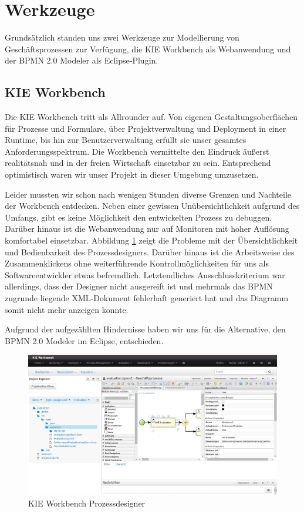 \section{Werkzeuge}
Grundsätzlich standen uns zwei Werkzeuge zur Modellierung von Geschäftsprozessen zur Verfügung, die KIE Workbench als Webanwendung und der BPMN 2.0 Modeler als Eclipse-Plugin.
\subsection{KIE Workbench}
Die KIE Workbench tritt als Allrounder auf. Von eigenen Gestaltungsoberflächen für Prozesse und Formulare, über Projektverwaltung und Deployment in einer Runtime, bis hin zur Benutzerverwaltung erfüllt sie unser gesamtes Anforderungsspektrum. Die Workbench vermittelte den Eindruck äußerst realitätsnah und in der freien Wirtschaft einsetzbar zu sein. Entsprechend optimistisch waren wir unser Projekt in dieser Umgebung umzusetzen.

Leider mussten wir schon nach wenigen Stunden diverse Grenzen und Nachteile der Workbench entdecken. Neben einer gewissen Unübersichtlichkeit aufgrund des Umfangs, gibt es keine Möglichkeit den entwickelten Prozess zu debuggen. Darüber hinaus ist die Webanwendung nur auf Monitoren mit hoher Auflösung komfortabel einsetzbar. Abbildung \ref{fig:KieWorkbench} zeigt die Probleme mit der Übersichtlichkeit und Bedienbarkeit des Prozessdesigners. Darüber hinaus ist die Arbeitsweise des Zusammenklickens ohne weiterführende Kontrollmöglichkeiten für uns als Softwareentwickler etwas befremdlich. Letztendliches Ausschlusskriterium war allerdings, dass der Designer nicht ausgereift ist und mehrmals das BPMN zugrunde liegende XML-Dokument fehlerhaft generiert hat und das Diagramm somit nicht mehr anzeigen konnte.

Aufgrund der aufgezählten Hindernisse haben wir uns für die Alternative, den BPMN 2.0 Modeler im Eclipse, entschieden.

\begin{figure}[H]
\centering
\includegraphics[width=0.95\linewidth]{../Bilder/KieWorkbench}
\caption{KIE Workbench Prozessdesigner}
\label{fig:KieWorkbench}
\end{figure}

